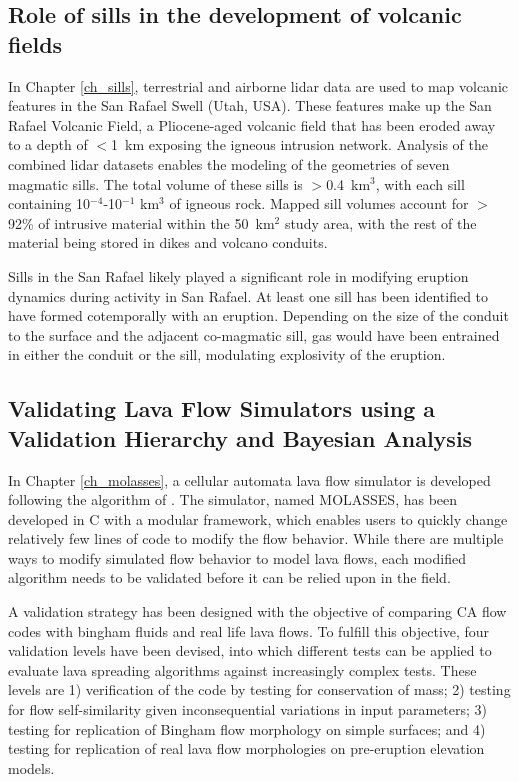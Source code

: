 \subsection{Role of sills in the development of volcanic fields}
In Chapter \ref{ch_sills}, terrestrial and airborne lidar data are used to map volcanic features in the San Rafael Swell (Utah, USA). These features make up the San Rafael Volcanic Field, a Pliocene-aged volcanic field that has been eroded away to a depth of $<$1~km exposing the igneous intrusion network. Analysis of the combined lidar datasets enables the modeling of the geometries of seven magmatic sills. The total volume of these sills is $>$0.4~km$^3$, with each sill containing 10$^{-4}$-10$^{-1}$ km$^3$ of igneous rock. Mapped sill volumes account for $>$92\% of intrusive material within the 50~km$^2$ study area, with the rest of the material being stored in dikes and volcano conduits.

Sills in the San Rafael likely played a significant role in modifying eruption dynamics during activity in San Rafael. At least one sill has been identified to have formed cotemporally with an eruption. Depending on the size of the conduit to the surface and the adjacent co-magmatic sill, gas would have been entrained in either the conduit or the sill, modulating explosivity of the eruption.

\subsection{Validating Lava Flow Simulators using a Validation Hierarchy and Bayesian Analysis}
In Chapter \ref{ch_molasses}, a cellular automata \citep{wolfram1984cellular} lava flow simulator is developed following the algorithm of \citet{connor2012probabilistic}. The simulator, named MOLASSES, has been developed in C with a modular framework, which enables users to quickly change relatively few lines of code to modify the flow behavior. While there are multiple ways to modify simulated flow behavior to model lava flows, each modified algorithm needs to be validated before it can be relied upon in the field. 

A validation strategy has been designed with the objective of comparing CA flow codes with bingham fluids and real life lava flows. To fulfill this objective, four validation levels have been devised, into which different tests can be applied to evaluate lava spreading algorithms against increasingly complex tests. These levels are 1) verification of the code by testing for conservation of mass; 2) testing for flow self-similarity given inconsequential variations in input parameters; 3) testing for replication of Bingham flow morphology on simple surfaces; and 4) testing for replication of real lava flow morphologies on pre-eruption elevation models. 

